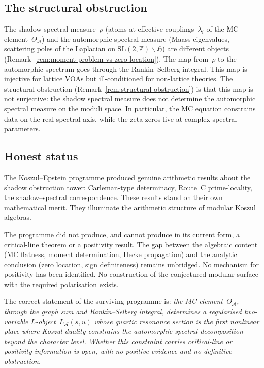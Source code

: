 \documentclass[11pt]{article}
\newcommand{\cA}{\mathcal{A}}
\newcommand{\bZ}{\mathbb{Z}}
\begin{document}
\subsection{The structural obstruction}

The shadow spectral measure~$\rho$ (atoms at effective
couplings~$\lambda_i$ of the MC element~$\Theta_\cA$) and the
automorphic spectral measure (Maass eigenvalues, scattering
poles of the Laplacian on
$\mathrm{SL}(2,\bZ)\backslash\mathfrak{H}$) are different
objects (Remark~\ref{rem:moment-problem-vs-zero-location}).
The map from~$\rho$ to the automorphic spectrum goes through
the Rankin--Selberg integral.  This map is injective for
lattice VOAs but ill-conditioned for non-lattice theories.
The structural obstruction
(Remark~\ref{rem:structural-obstruction}) is that this map is
not surjective: the shadow spectral measure does not determine
the automorphic spectral measure on the moduli space.  In
particular, the MC equation constrains data on the real spectral
axis, while the zeta zeros live at complex spectral parameters.

\subsection{Honest status}

The Koszul--Epstein programme produced genuine arithmetic results
about the shadow obstruction tower: Carleman-type determinacy, Route~C
prime-locality, the shadow--spectral correspondence.
These results stand on their own mathematical merit.  They
illuminate the arithmetic structure of modular Koszul algebras.

The programme did not produce, and cannot produce in its current
form, a critical-line theorem or a positivity result.  The gap
between the algebraic content (MC flatness, moment determination,
Hecke propagation) and the analytic conclusion (zero location,
sign definiteness) remains unbridged.  No mechanism for
positivity has been identified.  No construction of the
conjectured modular surface with the required polarisation
exists.

The correct statement of the surviving programme is:
\emph{the MC element~$\Theta_\cA$, through the graph sum and
Rankin--Selberg integral, determines a regularised two-variable
$L$-object~$L_\cA(s,u)$ whose quartic resonance section is the
first nonlinear place where Koszul duality constrains the
automorphic spectral decomposition beyond the character level.
Whether this constraint carries critical-line or positivity
information is open, with no positive evidence and no definitive
obstruction.}
\end{document}

